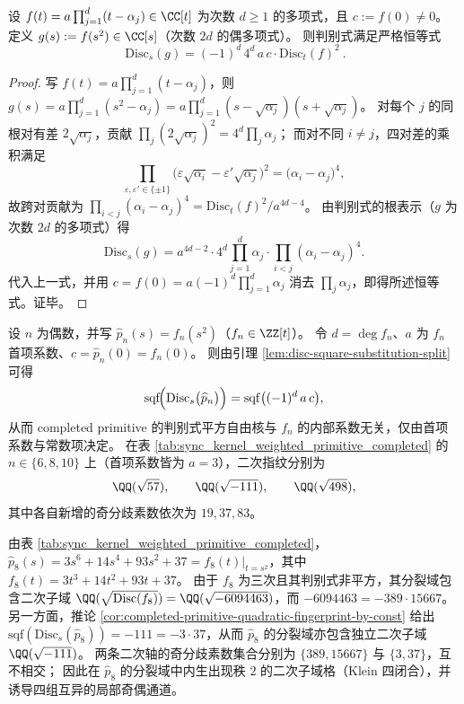 \begin{lemma}\label{lem:disc-square-substitution-split}
设 \(f(t)=a\prod_{j=1}^{d}(t-\alpha_j)\in\CC[t]\) 为次数 \(d\ge 1\) 的多项式，且 \(c:=f(0)\neq 0\)。
定义 \(g(s):=f(s^2)\in\CC[s]\)（次数 \(2d\) 的偶多项式）。
则判别式满足严格恒等式
\[
\boxed{\ \mathrm{Disc}_s(g)=(-1)^d\,4^d\,a\,c\cdot \mathrm{Disc}_t(f)^2\ }.
\]
\end{lemma}
\begin{proof}
写 \(f(t)=a\prod_{j=1}^{d}(t-\alpha_j)\)，则
\(
g(s)=a\prod_{j=1}^{d}(s^2-\alpha_j)
=a\prod_{j=1}^{d}(s-\sqrt{\alpha_j})(s+\sqrt{\alpha_j})
\)。
对每个 \(j\) 的同根对有差 \(2\sqrt{\alpha_j}\)，贡献
\(\prod_{j}(2\sqrt{\alpha_j})^2=4^d\prod_j \alpha_j\)；
而对不同 \(i\neq j\)，四对差的乘积满足
\[
\prod_{\varepsilon,\varepsilon'\in\{\pm 1\}}\bigl(\varepsilon\sqrt{\alpha_i}-\varepsilon'\sqrt{\alpha_j}\bigr)^2
=\bigl(\alpha_i-\alpha_j\bigr)^4,
\]
故跨对贡献为 \(\prod_{i<j}(\alpha_i-\alpha_j)^4=\mathrm{Disc}_t(f)^2/a^{4d-4}\)。
由判别式的根表示（\(g\) 为次数 \(2d\) 的多项式）得
\[
\mathrm{Disc}_s(g)=a^{4d-2}\cdot 4^d\prod_{j=1}^{d}\alpha_j\cdot\prod_{i<j}(\alpha_i-\alpha_j)^4.
\]
代入上一式，并用
\(
c=f(0)=a(-1)^d\prod_{j=1}^{d}\alpha_j
\)
消去 \(\prod_j\alpha_j\)，即得所述恒等式。证毕。
\end{proof}

\begin{corollary}\label{cor:completed-primitive-quadratic-fingerprint-by-const}
设 \(n\) 为偶数，并写 \(\widehat p_n(s)=f_n(s^2)\)（\(f_n\in\ZZ[t]\)）。
令 \(d=\deg f_n\)、\(a\) 为 \(f_n\) 首项系数、\(c=\widehat p_n(0)=f_n(0)\)。
则由引理 \ref{lem:disc-square-substitution-split} 可得
\[
\mathrm{sqf}\!\Bigl(\mathrm{Disc}_s\bigl(\widehat p_n\bigr)\Bigr)
=\mathrm{sqf}\bigl((-1)^d\,a\,c\bigr),
\]
从而 completed primitive 的判别式平方自由核与 \(f_n\) 的内部系数无关，仅由首项系数与常数项决定。
在表 \ref{tab:sync_kernel_weighted_primitive_completed} 的 \(n\in\{6,8,10\}\) 上（首项系数皆为 \(a=3\)），二次指纹分别为
\[
\QQ(\sqrt{57}),\qquad \QQ(\sqrt{-111}),\qquad \QQ(\sqrt{498}),
\]
其中各自新增的奇分歧素数依次为 \(19,37,83\)。
\end{corollary}

\begin{remark}\label{rem:hatp8-klein-four-quadratic-axes}
由表 \ref{tab:sync_kernel_weighted_primitive_completed}，
\(\widehat p_8(s)=3s^6+14s^4+93s^2+37=f_8(t)|_{t=s^2}\)，其中
\(
f_8(t)=3t^3+14t^2+93t+37
\)。
由于 \(f_8\) 为三次且其判别式非平方，其分裂域包含二次子域 \(\QQ(\sqrt{\mathrm{Disc}(f_8)})=\QQ(\sqrt{-6094463})\)，而
\(-6094463=-389\cdot 15667\)。
另一方面，推论 \ref{cor:completed-primitive-quadratic-fingerprint-by-const} 给出 \(\mathrm{sqf}(\mathrm{Disc}_s(\widehat p_8))=-111=-3\cdot 37\)，从而 \(\widehat p_8\) 的分裂域亦包含独立二次子域 \(\QQ(\sqrt{-111})\)。
两条二次轴的奇分歧素数集合分别为 \(\{389,15667\}\) 与 \(\{3,37\}\)，互不相交；
因此在 \(\widehat p_8\) 的分裂域中内生出现秩 \(2\) 的二次子域格（Klein 四闭合），并诱导四组互异的局部奇偶通道。
\end{remark}

